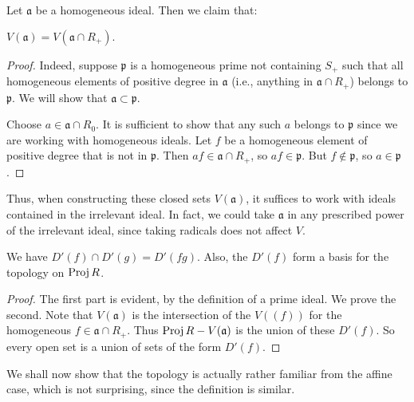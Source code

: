 Let $\mathfrak{a}$ be a homogeneous ideal. Then we claim that:
\begin{lemma} 
\(  V(\mathfrak{a}) = V(\mathfrak{a} \cap R_+).  \)
\end{lemma} 
\begin{proof} 
Indeed, suppose $\mathfrak{p}$ is a homogeneous prime not containing $S_+$ such
that all homogeneous
elements of positive degree in $\mathfrak{a}$ (i.e., anything in $\mathfrak{a}
\cap R_+$) belongs to $\mathfrak{p}$. We will
show that $\mathfrak{a} \subset \mathfrak{p}$.

Choose $a \in \mathfrak{a} \cap R_0$. It is sufficient to show that any such
$a$ belongs to $\mathfrak{p}$ since we are working with homogeneous ideals.
Let $f$ be a homogeneous element of positive degree that is not in
$\mathfrak{p}$.  Then $af \in \mathfrak{a} \cap R_+$, so $af \in \mathfrak{p}$.
But $f \notin \mathfrak{p}$, so $a \in \mathfrak{p}$.
\end{proof} 

Thus, when constructing these closed sets $V(\mathfrak{a})$, it suffices to
work with ideals contained in the irrelevant ideal. In fact, we could take
$\mathfrak{a}$ in any prescribed power of the irrelevant ideal, since taking
radicals does not affect $V$.

\begin{proposition} 
We have $D'(f) \cap D'(g) = D'(fg)$. Also, the $D'(f)$ form a basis for the
topology on $\operatorname{Proj} R$.
\end{proposition} 
\begin{proof} The first part is evident, by the definition of a prime ideal. We
prove the second.
Note that $V(\mathfrak{a})$ is the intersection of the $V((f))$ for the
homogeneous $f \in
\mathfrak{a} \cap R_+$. Thus $\operatorname{Proj} R - V(\mathfrak{a})$ is the union of these
$D'(f)$.
So every open set is a union of sets of the form $D'(f)$.
\end{proof} 

We shall now 
show that the topology is actually rather familiar from the affine case, which
is not surprising, since the definition is similar.

